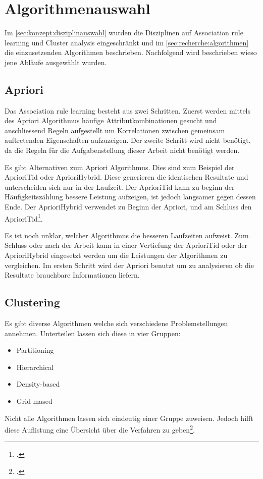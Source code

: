 \section{Algorithmenauswahl}
\label{sec:konzept:algorithmenauswahl}
Im \cref{sec:konzept:disziplinauswahl} wurden die Disziplinen auf Association rule learning und Cluster analysis eingeschränkt und im \cref{sec:recherche:algorithmen} die einzusetzenden Algorithmen beschrieben. Nachfolgend wird beschrieben wieso jene Abläufe ausgewählt wurden.

\subsection{Apriori}
Das Association rule learning besteht aus zwei Schritten. Zuerst werden mittels des Apriori Algorithmus häufige Attributkombinationen gesucht und anschliessend Regeln aufgestellt um Korrelationen zwischen gemeinsam auftretenden Eigenschaften aufzuzeigen.
Der zweite Schritt wird nicht benötigt, da die Regeln für die Aufgabenstellung dieser Arbeit nicht benötigt werden.

Es gibt Alternativen zum Apriori Algorithmus. Dies sind zum Beispiel der AprioriTid oder AprioriHybrid. Diese generieren die identischen Resultate und unterscheiden sich nur in der Laufzeit. Der AprioriTid kann zu beginn der Häufigkeitszählung bessere Leistung aufzeigen, ist jedoch langsamer gegen dessen Ende. Der AprioriHybrid verwendet zu Beginn der Apriori, und am Schluss den AprioriTid\footcite{association_rule_learning_2017-01-05}. 

Es ist noch unklar, welcher Algorithmus die besseren Laufzeiten aufweist. Zum Schluss oder nach der Arbeit kann in einer Vertiefung der AprioriTid oder der AprioriHybrid eingesetzt werden um die Leistungen der Algorithmen zu vergleichen. Im ersten Schritt wird der Apriori benutzt um zu analysieren ob die Resultate brauchbare Informationen liefern.

\subsection{Clustering}
\label{sec:konzept:algorithmenauswahl:clustering}
Es gibt diverse Algorithmen welche sich verschiedene Problemstellungen annehmen. Unterteilen lassen sich diese in vier Gruppen:
\begin{itemize}
	\item Partitioning
	\item Hierarchical
	\item Density-based
	\item Grid-mased
\end{itemize}
Nicht alle Algorithmen lassen sich eindeutig einer Gruppe zuweisen. Jedoch hilft diese Auflistung eine Übersicht über die Verfahren zu geben\footcite{data_mining_concepts_and_techniques}.

